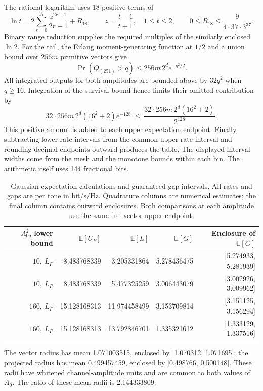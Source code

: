 \documentclass[10pt,letterpaper]{article}
\begin{document}
The rational logarithm uses 18 positive terms of
\[
 \ln t=2\sum_{r=0}^{17}\frac{z^{2r+1}}{2r+1}+R_{18},
 \qquad z=\frac{t-1}{t+1},\quad 1\leq t\leq2,
 \qquad
 0\leq R_{18}\leq\frac{9}{4\cdot37\cdot3^{37}}.
\]
Binary range reduction supplies the required multiples of the similarly enclosed \(\ln2\). For the tail, the Erlang moment-generating function at \(1/2\) and a union bound over \(256m\) primitive vectors give
\[
 \Pr(Q_{(251)}>q)\leq256m\,2^d e^{-q^2/2}.
\]
All integrated outputs for both amplitudes are bounded above by \(32q^2\) when \(q\geq16\). Integration of the survival bound hence limits their omitted contribution by
\begin{equation}
 32\cdot256m\,2^d(16^2+2)e^{-128}
 \ \leq\ \frac{32\cdot256m\,2^d(16^2+2)}{2^{128}}.
\end{equation}
This positive amount is added to each upper expectation endpoint. Finally, subtracting lower-rate intervals from the common upper-rate interval and rounding decimal endpoints outward produces the table. The displayed interval widths come from the mesh and the monotone bounds within each bin. The arithmetic itself uses 144 fractional bits.

\begin{table}[htbp]
\centering
\small
\caption{Gaussian expectation calculations and guaranteed gap intervals. All rates and gaps are per tone in bit/s/Hz. Quadrature columns are numerical estimates; the final column contains outward enclosures. Both comparisons at each amplitude use the same full-vector upper endpoint.}
\label{supp:table1}
\begin{tabular}{rrrrr}
\hline
\(A_0^2\), lower bound & \(\mathbb E[U_F]\) & \(\mathbb E[L]\) & \(\mathbb E[G]\) & Enclosure of \(\mathbb E[G]\)\\
\hline
\(10,\ L_F\) & 8.483768339 & 3.205331864 & 5.278436475 & [5.274933, 5.281939]\\
\(10,\ L_P\) & 8.483768339 & 5.477325259 & 3.006443079 & [3.002926, 3.009962]\\
\(160,\ L_F\) & 15.128168313 & 11.974458499 & 3.153709814 & [3.151125, 3.156294]\\
\(160,\ L_P\) & 15.128168313 & 13.792846701 & 1.335321612 & [1.333129, 1.337516]\\
\hline
\end{tabular}

\smallskip
\parbox{0.98\linewidth}{\small
The vector radius has mean 1.071003515, enclosed by [1.070312, 1.071695]; the projected radius has mean 0.499457459, enclosed by [0.498766, 0.500148]. These radii have whitened channel-amplitude units and are common to both values of \(A_0\). The ratio of these mean radii is 2.144333809.}
\end{table}
\end{document}
